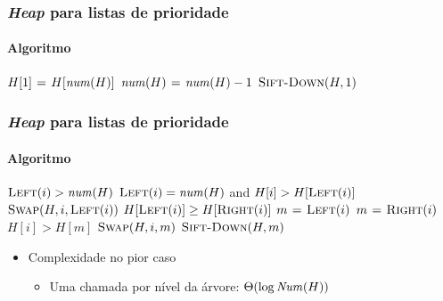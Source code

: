 \documentclass{beamer}
\begin{document}
\begin{frame}
  \frametitle{\textit{Heap} para listas de prioridade}
  \framesubtitle{Algoritmo}

\begin{codebox}
\zi \Comment {}
\li $H[1] \gets H[\id{num}(H)]$
\li $\id{num}(H) \gets \id{num}(H) - 1$
\li $\textnormal{\scshape Sift-Down}(H, 1)$
    \End
\end{codebox}

\end{frame}

\begin{frame}
  \frametitle{\textit{Heap} para listas de prioridade}
  \framesubtitle{Algoritmo}

\begin{codebox}
\li \If $\proc{Left}(i) > \id{num}(H)$
\li   \Then \Return
\li   \ElseIf $\proc{Left}(i) = \id{num}(H)$ and $H[i] > H[\textnormal{\scshape Left}(i)]$
\li   \Then 
         $\textnormal{\scshape Swap}(H, i, \textnormal{\scshape Left}(i))$
\li   \ElseNoIf
\li       \If $H[\textnormal{\scshape Left}(i)] \ge H[\textnormal{\scshape Right}(i)]$
\li       \Then $m \mathrel{\hspace{1pt}=\hspace{1pt}} \textnormal{\scshape Left}(i)$
\li       \Else $m \mathrel{\hspace{1pt}=\hspace{1pt}} \textnormal{\scshape Right}(i)$
        \End
\li     \If $H[i] > H[m]$
\li       \Then 
            $\textnormal{\scshape Swap}(H, i, m)$
\li         $\textnormal{\scshape Sift-Down}(H, m)$
          \End 
      \End
\end{codebox}  

\begin{itemize}
\item Complexidade no pior caso
\begin{itemize}
  \item Uma chamada por nível da árvore: $\Theta(\log \id{Num}(H))$
\end{itemize}
\end{itemize}
\end{frame}
\end{document}
